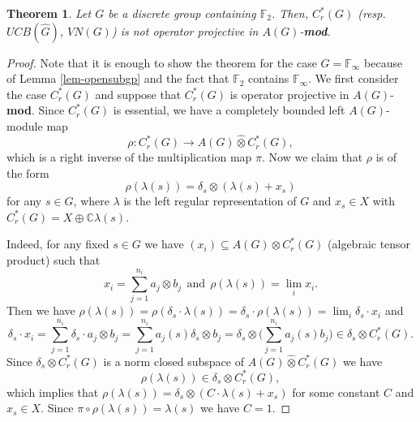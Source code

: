 \documentclass[10pt]{amsart}
\newtheorem{thm}{Theorem}
\numberwithin{thm}{section}
\numberwithin{equation}{section}
\begin{document}
	\begin{thm}\label{thm-free-Cr(G)}
	Let $G$ be a discrete group containing $\mathbb{F}_2$.
	Then, $C^*_r(G)$ (resp. $UCB(\widehat{G})$, $VN(G)$) is not operator projective in $A(G)$-{\bf mod}.
	\end{thm}
\begin{proof}
Note that it is enough to show the theorem for the case $G = \mathbb{F}_\infty$
because of Lemma \ref{lem-opensubgp} and the fact that $\mathbb{F}_2$ contains $\mathbb{F}_\infty$.
We first consider the case $C^*_r(G)$ and suppose that $C^*_r(G)$ is operator projective in $A(G)$-{\bf mod}.
Since $C^*_r(G)$ is essential, we have a completely bounded left $A(G)$-module map
	$$\rho : C^*_r(G) \rightarrow A(G) {\widehat{\otimes}} C^*_r(G),$$
which is a right inverse of the multiplication map $\pi$. Now we claim that $\rho$ is of the form
	\begin{equation}\label{right-inverse}
	\rho(\lambda(s)) = \delta_s \otimes (\lambda(s) + x_s)
	\end{equation}
for any $s\in G$, where $\lambda$ is the left regular representation of $G$ and $x_s \in X$ with $C^*_r(G) = X\oplus \mathbb{C}\lambda(s)$.

Indeed, for any fixed $s\in G$ we have $(x_i) \subseteq A(G)\otimes C^*_r(G)$ (algebraic tensor product) such that
	$$x_i = \sum^{n_i}_{j=1} a_j \otimes b_j\;\, \text{and}\;\, \rho(\lambda(s)) = \lim_i x_i.$$
Then we have $\rho(\lambda(s)) = \rho(\delta_s\cdot \lambda(s)) = \delta_s\cdot \rho(\lambda(s)) = \lim_i \delta_s\cdot x_i$ and
	$$\delta_s \cdot x_i = \sum^{n_i}_{j=1}\delta_s\cdot a_j \otimes b_j = \sum^{n_i}_{j=1}a_j(s)\delta_s \otimes b_j
	= \delta_s\otimes \Big(\sum^{n_i}_{j=1} a_j(s) b_j\Big) \in \delta_s \otimes C^*_r(G).$$
Since $\delta_s \otimes C^*_r(G)$ is a norm closed subspace of $A(G) {\widehat{\otimes}} C^*_r(G)$ we have
	$$\rho(\lambda(s)) \in \delta_s \otimes C^*_r(G),$$
which implies that $\rho(\lambda(s)) = \delta_s \otimes (C \cdot \lambda(s) + x_s)$
for some constant $C$ and $x_s \in X$. Since $\pi \circ \rho (\lambda(s)) = \lambda(s)$ we have $C=1$.


\end{proof}
\end{document}
